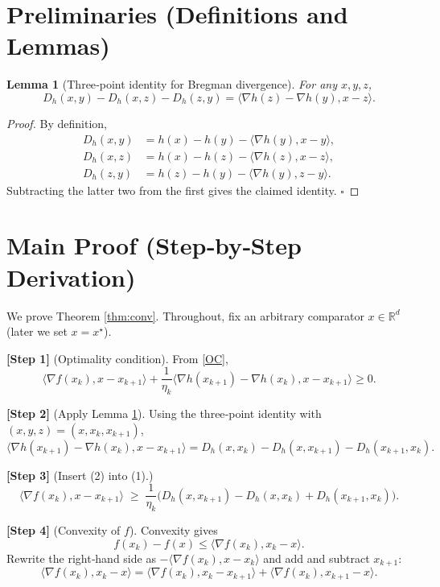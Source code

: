 \documentclass{article}
\newtheorem{lemma}{Lemma}
\newcommand{\inner}[2]{\langle #1,#2\rangle}
\newcommand{\grad}{\nabla}
\newcommand{\Breg}[2]{D_{h}(#1,#2)}
\begin{document}
\newpage
\section*{Preliminaries (Definitions and Lemmas)}
\begin{lemma}[Three‑point identity for Bregman divergence]
\label{lem:three_point}
For any $x,y,z$,
\[
    \Breg{x}{y}-\Breg{x}{z}-\Breg{z}{y}
    =\inner{\grad h(z)-\grad h(y)}{x-z}.
\]
\end{lemma}
\begin{proof}
By definition,
\[
\begin{aligned}
\Breg{x}{y}&=h(x)-h(y)-\inner{\grad h(y)}{x-y},\\
\Breg{x}{z}&=h(x)-h(z)-\inner{\grad h(z)}{x-z},\\
\Breg{z}{y}&=h(z)-h(y)-\inner{\grad h(y)}{z-y}.
\end{aligned}
\]
Subtracting the latter two from the first gives the claimed identity. \hfill $\square$
\end{proof}

\section*{Main Proof (Step‑by‑Step Derivation)}
We prove Theorem \ref{thm:conv}. Throughout, fix an arbitrary comparator $x\in\mathbb{R}^{d}$ (later we set $x=x^{\star}$).

\noindent\textbf{[Step 1]} (Optimality condition).  
From \eqref{OC},
\[
\inner{\grad f(x_{k})}{x-x_{k+1}}+\frac{1}{\eta_{k}}\inner{\grad h(x_{k+1})-\grad h(x_{k})}{x-x_{k+1}}\ge0.
\tag{1}
\]

\noindent\textbf{[Step 2]} (Apply Lemma \ref{lem:three_point}).  
Using the three‑point identity with $(x,y,z)=(x,x_{k},x_{k+1})$,
\[
\inner{\grad h(x_{k+1})-\grad h(x_{k})}{x-x_{k+1}}
= \Breg{x}{x_{k}}-\Breg{x}{x_{k+1}}-\Breg{x_{k+1}}{x_{k}}.
\tag{2}
\]

\noindent\textbf{[Step 3]} (Insert (2) into (1).)  
\[
\inner{\grad f(x_{k})}{x-x_{k+1}}
\;\ge\;\frac{1}{\eta_{k}}\Big(
\Breg{x}{x_{k+1}}-\Breg{x}{x_{k}}+\Breg{x_{k+1}}{x_{k}}
\Big).
\tag{3}
\]

\noindent\textbf{[Step 4]} (Convexity of $f$).  
Convexity gives
\[
f(x_{k})-f(x)\le\inner{\grad f(x_{k})}{x_{k}-x}.
\tag{4}
\]
Rewrite the right‑hand side as $-\inner{\grad f(x_{k})}{x-x_{k}}$ and add and subtract $x_{k+1}$:
\[
\inner{\grad f(x_{k})}{x_{k}-x}
= \inner{\grad f(x_{k})}{x_{k}-x_{k+1}}+\inner{\grad f(x_{k})}{x_{k+1}-x}.
\tag{5}
\]
\end{document}
